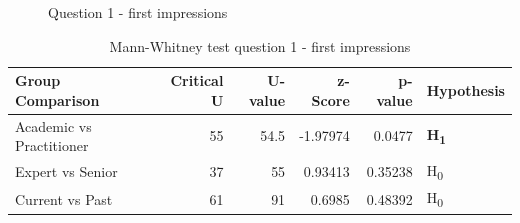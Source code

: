 

\begin{figure}
    \centering
    \caption{Question 1 - first impressions}
    \label{fig:stackedbar_Q1}
\end{figure} 

\begin{table} 
    \begin{center}
        \begin{tabular}{ |l ||r |r |r | r|l | } 
            \hline
            Group Comparison                 & Critical U & U-value & z-Score  & p-value & Hypothesis         \\
            \hline
            \hline
            Academic vs Practitioner         & 55         & 54.5    & -1.97974 & 0.0477  & \textbf{H\textsubscript{1}}  \\ 
            \hline
            Expert vs Senior                 & 37         & 55      & 0.93413  & 0.35238 & H\textsubscript{0} \\ 
            \hline
            Current vs Past                  & 61         & 91      & 0.6985   & 0.48392 & H\textsubscript{0} \\ 
            \hline
        \end{tabular}
    \end{center}
    \caption{Mann-Whitney test question 1 - first impressions}
    \label{table:mannwhitneyQ1}
\end{table}

